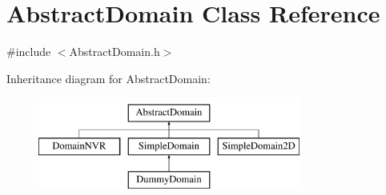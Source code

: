 \hypertarget{class_abstract_domain}{}\section{Abstract\+Domain Class Reference}
\label{class_abstract_domain}


{\ttfamily \#include $<$Abstract\+Domain.\+h$>$}

Inheritance diagram for Abstract\+Domain\+:\begin{figure}[H]
\begin{center}
\leavevmode
\includegraphics[height=3.000000cm]{class_abstract_domain}
\end{center}
\end{figure}
